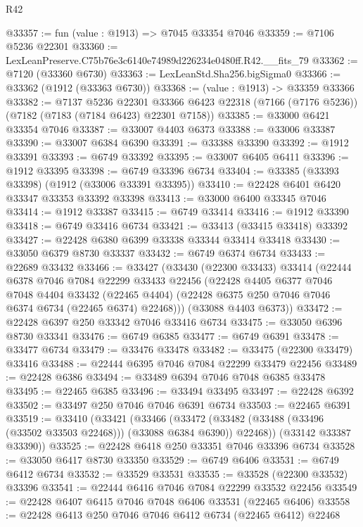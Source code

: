 \begin{lexlean}{R42}
\begin{coremodule}
{@33357 := fun (value : @1913) => @7045 @33354 @7046
@33359 := @7106 @5236 @22301
@33360 := LexLeanPreserve.C75b76e3c6140e74989d226234e0480ff.R42.__fits_79
@33362 := @7120 (@33360 @6730)
@33363 := LexLeanStd.Sha256.bigSigma0
@33366 := @33362 (@1912 (@33363 @6730))
@33368 := (value : @1913) -> @33359 @33366
@33382 := @7137
    @5236
    @22301
    @33366
    @6423
    @22318
    (@7166 (@7176 @5236))
    (@7182 (@7183 (@7184 @6423) @22301 @7158))
@33385 := @33000 @6421 @33354 @7046
@33387 := @33007 @4403 @6373
@33388 := @33006 @33387
@33390 := @33007 @6384 @6390
@33391 := @33388 @33390
@33392 := @1912 @33391
@33393 := @6749 @33392
@33395 := @33007 @6405 @6411
@33396 := @1912 @33395
@33398 := @6749 @33396 @6734
@33404 := @33385 (@33393 @33398) (@1912 (@33006 @33391 @33395))
@33410 := @22428 @6401 @6420 @33347 @33353 @33392 @33398
@33413 := @33000 @6400 @33345 @7046
@33414 := @1912 @33387
@33415 := @6749 @33414
@33416 := @1912 @33390
@33418 := @6749 @33416 @6734
@33421 := @33413 (@33415 @33418) @33392
@33427 := @22428 @6380 @6399 @33338 @33344 @33414 @33418
@33430 := @33050 @6379 @8730 @33337
@33432 := @6749 @6374 @6734
@33433 := @22689 @33432
@33466 := @33427
    (@33430
      (@22300 @33433)
      @33414
      (@22444
        @6378
        @7046
        @7084
        @22299
        @33433
        @22456
        (@22428
          @4405
          @6377
          @7046
          @7048
          @4404
          @33432
          (@22465 @4404)
          (@22428 @6375 @250 @7046 @7046 @6374 @6734 (@22465 @6374) @22468)))
      (@33088 @4403 @6373))
@33472 := @22428 @6397 @250 @33342 @7046 @33416 @6734
@33475 := @33050 @6396 @8730 @33341
@33476 := @6749 @6385
@33477 := @6749 @6391
@33478 := @33477 @6734
@33479 := @33476 @33478
@33482 := @33475 (@22300 @33479) @33416
@33488 := @22444 @6395 @7046 @7084 @22299 @33479 @22456
@33489 := @22428 @6386
@33494 := @33489 @6394 @7046 @7048 @6385 @33478
@33495 := @22465 @6385
@33496 := @33494 @33495
@33497 := @22428 @6392
@33502 := @33497 @250 @7046 @7046 @6391 @6734
@33503 := @22465 @6391
@33519 := @33410
    (@33421
      (@33466
        (@33472 (@33482 (@33488 (@33496 (@33502 @33503 @22468))) (@33088 @6384 @6390)) @22468))
      (@33142 @33387 @33390))
@33525 := @22428 @6418 @250 @33351 @7046 @33396 @6734
@33528 := @33050 @6417 @8730 @33350
@33529 := @6749 @6406
@33531 := @6749 @6412 @6734
@33532 := @33529 @33531
@33535 := @33528 (@22300 @33532) @33396
@33541 := @22444 @6416 @7046 @7084 @22299 @33532 @22456
@33549 := @22428 @6407 @6415 @7046 @7048 @6406 @33531 (@22465 @6406)
@33558 := @22428 @6413 @250 @7046 @7046 @6412 @6734 (@22465 @6412) @22468
}
\end{coremodule}
\end{lexlean}

